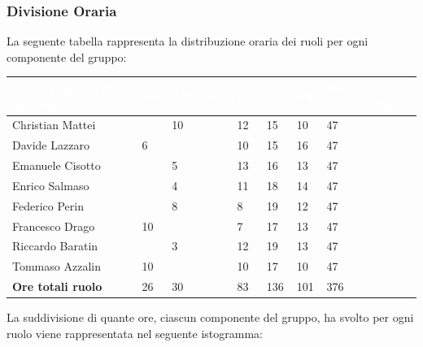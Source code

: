 \subsubsection{Divisione Oraria}
La seguente tabella rappresenta la distribuzione oraria dei ruoli per ogni componente del gruppo:
{
	\renewcommand{\arraystretch}{2}
	\begin{table}[h]
	\caption{Tabella della divisione oraria della Progettazione di Dettaglio e Codifica}
	
\begin{longtable}{ C{5cm} C{1cm} C{1cm} C{1cm} C{1cm} C{1cm} C{1cm} C{3cm}}
	\textcolor{white}{\textbf{Nome membro del gruppo}} & 
	\textcolor{white}{\textbf{RE}} & 
	\textcolor{white}{\textbf{AM}} & 
	\textcolor{white}{\textbf{AN}} & 
	\textcolor{white}{\textbf{PT}} & 
	\textcolor{white}{\textbf{PR}} & 
	\textcolor{white}{\textbf{VE}} & 
	\textcolor{white}{\textbf{Ore complessive}}\\
\endhead	
        
        Christian Mattei & & 10 & & 12 & 15 & 10 & 47\\
        Davide Lazzaro & 6 & & & 10 & 15 & 16 & 47\\
        Emanuele Cisotto & & 5 & & 13 & 16 & 13 & 47 \\
        Enrico Salmaso & & 4 & & 11 & 18 & 14 & 47\\
        Federico Perin & & 8 & & 8 & 19 & 12 & 47\\
        Francesco Drago & 10 & & & 7 & 17 & 13 & 47\\
        Riccardo Baratin & & 3 & & 12 & 19 & 13 & 47\\
        Tommaso Azzalin & 10 & & & 10 & 17 & 10 & 47 \\
        \textbf{Ore totali ruolo} & 26 & 30 & & 83 & 136 & 101 & 376\\
		
	\end{longtable}
\end{table}
}
\newline
La suddivisione di quante ore, ciascun componente del gruppo, ha svolto per ogni ruolo viene rappresentata nel seguente istogramma:




